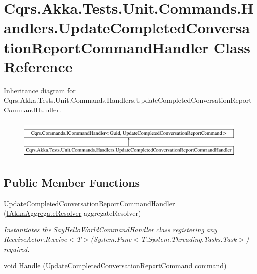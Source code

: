 \hypertarget{classCqrs_1_1Akka_1_1Tests_1_1Unit_1_1Commands_1_1Handlers_1_1UpdateCompletedConversationReportCommandHandler}{}\section{Cqrs.\+Akka.\+Tests.\+Unit.\+Commands.\+Handlers.\+Update\+Completed\+Conversation\+Report\+Command\+Handler Class Reference}
\label{classCqrs_1_1Akka_1_1Tests_1_1Unit_1_1Commands_1_1Handlers_1_1UpdateCompletedConversationReportCommandHandler}
Inheritance diagram for Cqrs.\+Akka.\+Tests.\+Unit.\+Commands.\+Handlers.\+Update\+Completed\+Conversation\+Report\+Command\+Handler\+:\begin{figure}[H]
\begin{center}
\leavevmode
\includegraphics[height=1.964912cm]{classCqrs_1_1Akka_1_1Tests_1_1Unit_1_1Commands_1_1Handlers_1_1UpdateCompletedConversationReportCommandHandler}
\end{center}
\end{figure}
\subsection*{Public Member Functions}
\begin{DoxyCompactItemize}
\item 
\hyperlink{classCqrs_1_1Akka_1_1Tests_1_1Unit_1_1Commands_1_1Handlers_1_1UpdateCompletedConversationReportCommandHandler_a816316549866b3e4abb410a7b9ea06a3_a816316549866b3e4abb410a7b9ea06a3}{Update\+Completed\+Conversation\+Report\+Command\+Handler} (\hyperlink{interfaceCqrs_1_1Akka_1_1Domain_1_1IAkkaAggregateResolver}{I\+Akka\+Aggregate\+Resolver} aggregate\+Resolver)
\begin{DoxyCompactList}\small\item\em Instantiates the \hyperlink{classCqrs_1_1Akka_1_1Tests_1_1Unit_1_1Commands_1_1Handlers_1_1SayHelloWorldCommandHandler}{Say\+Hello\+World\+Command\+Handler} class registering any Receive\+Actor.\+Receive$<$\+T$>$(\+System.\+Func$<$\+T,\+System.\+Threading.\+Tasks.\+Task$>$) required. \end{DoxyCompactList}\item 
void \hyperlink{classCqrs_1_1Akka_1_1Tests_1_1Unit_1_1Commands_1_1Handlers_1_1UpdateCompletedConversationReportCommandHandler_aecb596ab5c5e17823b93ac4fcae0e43e_aecb596ab5c5e17823b93ac4fcae0e43e}{Handle} (\hyperlink{classCqrs_1_1Akka_1_1Tests_1_1Unit_1_1Commands_1_1UpdateCompletedConversationReportCommand}{Update\+Completed\+Conversation\+Report\+Command} command)
\end{DoxyCompactItemize}
